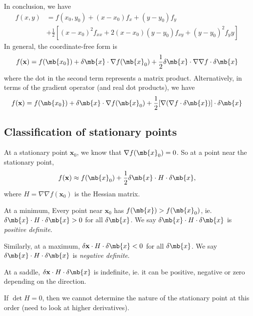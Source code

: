 \documentclass[a4paper]{article}
\begin{document}
  In conclusion, we have
  \begin{align*}
    f(x, y) &= f(x_0, y_0) + (x - x_0)f_x + (y - y_0)f_y \\
    &+ \frac{1}{2}[(x - x_0)^2 f_{xx} + 2(x - x_0)(y - y_0)f_{xy} + (y - y_0)^2 f_yy]
  \end{align*}
  In general, the coordinate-free form is
  \[
    f(\mathbf{x}) = f(\mb{x_0}) + \delta \mb{x}\cdot\nabla f(\mb{x}_0) + \frac{1}{2}\delta \mb{x}\cdot \nabla \nabla f\cdot \delta \mb{x}
  \]
  where the dot in the second term represents a matrix product. Alternatively, in terms of the gradient operator (and real dot products), we have
  \[
    f(\mathbf{x}) = f(\mb{x_0}) + \delta \mb{x}\cdot \nabla f(\mb{x}_0) + \frac{1}{2}[\nabla (\nabla f\cdot \delta \mb{x})]\cdot \delta\mb{x}
  \]

  \subsection{Classification of stationary points}
  At a stationary point $\mathbf{x}_0$, we know that $\nabla f(\mb{x}_0) = 0$. So at a point near the stationary point,
  \[
    f(\mathbf{x})\approx f(\mb{x}_0) + \frac{1}{2}\delta\mb{x}\cdot H\cdot \delta\mb{x},
  \]
  where $H = \nabla\nabla f(\mathbf{x}_0)$  is the Hessian matrix.

  At a minimum, Every point near $\mathbf{x}_0$ has $f(\mb{x}) > f(\mb{x}_0)$, ie. $\delta \mb{x}\cdot H\cdot \delta \mb{x} > 0$ for all $\delta \mb{x}$. We say $\delta \mb{x}\cdot H\cdot\delta \mb{x}$ is \emph{positive definite}.

  Similarly, at a maximum, $\delta \mathbf{x}\cdot H\cdot \delta\mb{x} < 0$ for all $\delta \mb{x}$. We say $\delta \mb{x}\cdot H\cdot \delta \mb{x}$ is \emph{negative definite}.

  At a saddle, $\delta \mathbf{x} \cdot H\cdot \delta\mb{x}$ is indefinite, ie. it can be positive, negative or zero depending on the direction.

  \note If $\det H = 0$, then we cannot determine the nature of the stationary point at this order (need to look at higher derivatives).
\end{document}
